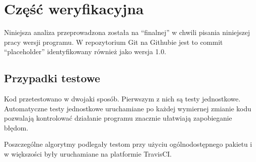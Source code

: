 \section[Weryfikacja]{Część weryfikacyjna} %
    Niniejsza analiza przeprowadzona została na ``finalnej'' w chwili pisania
    niniejszej pracy wersji programu.  W repozytorium Git na Githubie jest to
    commit ``placeholder''  identyfikowany
    również jako wersja 1.0.

    \subsection{Przypadki testowe}

    Kod przetestowano w dwojaki sposób. Pierwszym z nich są testy jednostkowe.
    Automatyczne testy jednostkowe uruchamiane po każdej wymiernej zmianie kodu
    pozwalają kontrolować działanie programu znacznie ułatwiają zapobieganie
    błędom.

    Poszczególne algorytmy podlegały testom przy użyciu ogólnodostępnego
    pakietu   i w większości były
    uruchamiane na platformie TravisCI.

